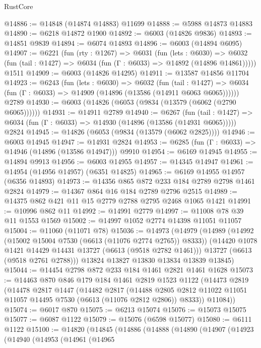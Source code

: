 \begin{lexlean}{RustCore}
\begin{coremodule}
@14886 := @14848 (@14874 @14883) @11699
@14888 := @5988 @14873 @14883
@14890 := @6218 @14872 @1900
@14892 := @6003 (@14826 @9836)
@14893 := @14851 @9839
@14894 := @6074 @14893
@14896 := @6003 (@14894 @6095)
@14907 := @6221
    (fun (rty : @1267) =>
    @6031
      (fun (lets : @6030) =>
      @6032 (fun (tail : @1427) => @6034 (fun (Γ : @6033) => @14892 (@14896 @14861)))))
    @1511
@14909 := @6003 (@14826 @14295)
@14911 := @13587 @14856 @11704
@14923 := @6243
    (fun (lets : @6030) =>
    @6032
      (fun (tail : @1427) =>
      @6034 (fun (Γ : @6033) => @14909 (@14896 (@13586 (@14911 @6063 @6065))))))
    @2789
@14930 := @6003 (@14826 (@6053 (@9834 (@13579 (@6062 (@2790 @6065))))))
@14931 := @14911 @2789
@14940 := @6267
    (fun (tail : @1427) => @6034 (fun (Γ : @6033) => @14930 (@14896 (@13586 (@14931 @6065)))))
    @2824
@14945 := @14826 (@6053 (@9834 (@13579 (@6062 @2825))))
@14946 := @6003 @14945
@14947 := @14931 @2824
@14953 := @6285 (fun (Γ : @6033) => @14946 (@14896 (@13586 @14947))) @9910
@14954 := @6169 @14945
@14955 := @14894 @9913
@14956 := @6003 @14955
@14957 := @14345 @14947
@14961 := @14954 (@14956 @14957) (@6351 @14825)
@14965 := @6169 @14955 @14957 (@6356 @14893)
@14973 := @14356 @865 @872 @233 @184 @2789 @2798 @1461 @2824
@14979 := @14367 @864 @16 @184 @2789 @2796 @2515
@14989 := @14375 @862 @421 @11 @15 @2779 @2788 @2795 @2468 @1065 @1421
@14991 := @10996 @862 @11
@14992 := @14991 @2779
@14997 := @11008 @78 @39 @11 @1553 @1569
@15002 := @14997 @1052 @2774 @14398 @11051 @11057
@15004 := @11060 (@11071 @78)
@15036 := @14973
    (@14979
      (@14989
        (@14992 (@15002 @15004 @7530 (@6613 (@11076 @2774 @2765)) @8333))
        (@14420 @1078 @1421 @14429 @14431 @13727 (@6613 (@9518 @2782 @1461)))
        @13727
        (@6613 (@9518 @2761 @2788)))
      @13824
      @13827
      @13830
      @13834
      @13839
      @13845)
@15044 := @14454 @2798 @872 @233 @184 @1461 @2821 @1461 @1628
@15073 := @14463
    @870
    @846
    @179
    @184
    @1461
    @2819
    @1523
    @1122
    (@14473
      @2819
      (@14478
        @2817
        @1447
        (@14482
          @2817
          (@14488 @2805 @2812 @11022 @11051 @11057 @14495 @7530 (@6613 (@11076 @2812 @2806)) @8333))
        @11084))
@15074 := @6017 @870
@15075 := @6213 @15074
@15076 := @15073 @15075
@15077 := @6087 @1122
@15079 := @15076 (@6598 @15077)
@15080 := @6111 @1122
@15100 := @14820
    (@14845
      (@14886
        (@14888
          (@14890
            (@14907
              (@14923
                (@14940
                  (@14953
                    (@14961
                      (@14965

\end{coremodule}
\end{lexlean}
